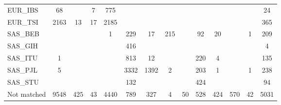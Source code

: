 \begin{table}[ht]
\begin{tabular}{|l|c|c|c|c|c|c|c|c|c|c|c|c|c|}
  EUR\_IBS & 68 &  & 7 & 775 &  &  &  &  &  &  &  &  & 24 \\ 
  EUR\_TSI & 2163 & 13 & 17 & 2185 &  &  &  &  &  &  &  &  & 365 \\ 
   \hline
SAS\_BEB &  &  &  & 1 & 229 & 17 & 215 &  & 92 & 20 &  & 1 & 209 \\ 
  SAS\_GIH &  &  &  &  & 416 &  &  &  &  &  &  &  & 4 \\ 
  SAS\_ITU & 1 &  &  &  & 813 & 12 &  &  & 220 & 4 &  &  & 135 \\ 
  SAS\_PJL & 5 &  &  &  & 3332 & 1392 & 2 &  & 203 & 1 &  & 1 & 238 \\ 
  SAS\_STU &  &  &  &  & 132 &  &  &  & 424 &  &  &  & 94 \\ 
   \hline
Not matched & 9548 & 425 & 43 & 4440 & 789 & 327 & 4 & 50 & 528 & 424 & 570 & 42 & 5031 \\ 
   \hline
\end{tabular}
\end{table}
